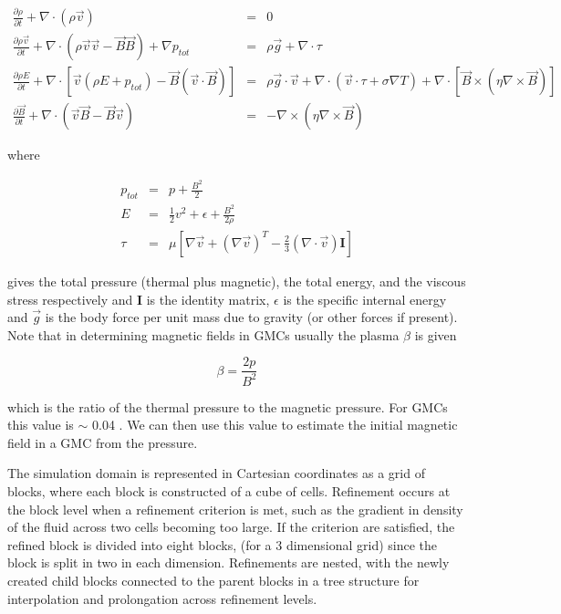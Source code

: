 \documentclass[11pt]{article}
\begin{document}
\begin{eqnarray}
\frac{\partial \rho}{\partial t} + \nabla \cdot \left(\rho \vec{v} \right) &=& 0 \\
\frac{\partial \rho \vec{v}}{\partial t} + \nabla \cdot \left(\rho \vec{v} \vec{v} - \vec{B} \vec{B} \right) + \nabla p_{tot} &=& \rho \vec{g} + \nabla \cdot \tau \\
\frac{\partial \rho E}{\partial t} + \nabla \cdot \left[\vec{v} \left(\rho E + p_{tot} \right) - \vec{B} \left(\vec{v} \cdot \vec{B}\right)\right] &=& \rho \vec{g} \cdot \vec{v} + \nabla \cdot \left(\vec{v} \cdot \tau + \sigma \nabla T \right) + \nabla \cdot \left[ \vec{B} \times \left( \eta \nabla \times \vec{B} \right) \right] \\
\frac{\partial \vec{B}}{\partial t} + \nabla \cdot \left(\vec{v} \vec{B} - \vec{B} \vec{v}\right) &=& - \nabla \times \left(\eta \nabla \times \vec{B}\right) 
\end{eqnarray}

\noindent
where

\begin{eqnarray}
p_{tot} &=& p + \frac{B^2}{2} \\
E &=& \frac{1}{2}v^2 + \epsilon + \frac{B^2}{2 \rho} \\
\tau &=& \mu\left[\nabla \vec{v} + \left(\nabla \vec{v}\right)^T - \frac{2}{3}\left(\nabla \cdot \vec{v}\right) \mathbf{I} \right]
\end{eqnarray}

\noindent
gives the total pressure (thermal plus magnetic), the total energy, and the viscous stress respectively and $\mathbf{I}$ is the identity matrix, $\epsilon$ is the specific internal energy and $\vec{g}$ is the body force per unit mass due to gravity (or other forces if present). Note that in determining magnetic fields in GMCs usually the plasma $\beta$ is given

\begin{equation}
\beta = \frac{2p}{B^2}
\end{equation}

\noindent
which is the ratio of the thermal pressure to the magnetic pressure. For GMCs this value is $\sim$ 0.04 \citep{Crutcher_1999}. We can then use this value to estimate the initial magnetic field in a GMC from the pressure.

The simulation domain is represented in Cartesian coordinates as a grid of blocks, where each block is constructed of a cube of cells. Refinement occurs at the block level when a refinement criterion is met, such as the gradient in density of the fluid across two cells becoming too large. If the criterion are satisfied, the refined block is divided into eight blocks, (for a 3 dimensional grid) since the block is split in two in each dimension. Refinements are nested, with the newly created child blocks connected to the parent blocks in a tree structure for interpolation and prolongation across refinement levels.
\end{document}
